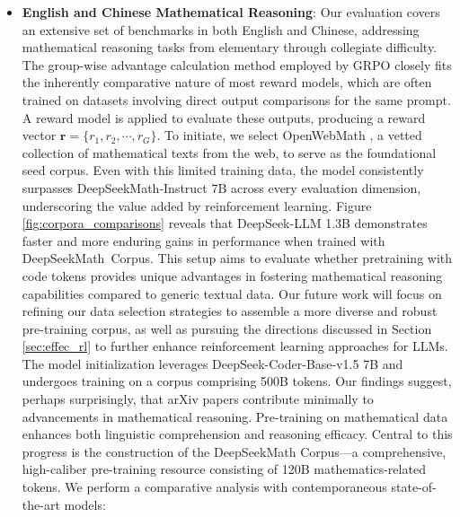 \begin{itemize}[topsep=0pt]
    \item \textbf{English and Chinese Mathematical Reasoning}: Our evaluation covers an extensive set of benchmarks in both English and Chinese, addressing mathematical reasoning tasks from elementary through collegiate difficulty. The group-wise advantage calculation method employed by GRPO closely fits the inherently comparative nature of most reward models, which are often trained on datasets involving direct output comparisons for the same prompt. A reward model is applied to evaluate these outputs, producing a reward vector $\mathbf{r} = \{r_1, r_2, \cdots, r_G\}$. To initiate, we select OpenWebMath \citep{openwebmath}, a vetted collection of mathematical texts from the web, to serve as the foundational seed corpus. Even with this limited training data, the model consistently surpasses DeepSeekMath-Instruct 7B across every evaluation dimension, underscoring the value added by reinforcement learning. Figure \ref{fig:corpora_comparisons} reveals that DeepSeek-LLM 1.3B demonstrates faster and more enduring gains in performance when trained with DeepSeekMath~Corpus. This setup aims to evaluate whether pretraining with code tokens provides unique advantages in fostering mathematical reasoning capabilities compared to generic textual data. Our future work will focus on refining our data selection strategies to assemble a more diverse and robust pre-training corpus, as well as pursuing the directions discussed in Section \ref{sec:effec_rl} to further enhance reinforcement learning approaches for LLMs. The model initialization leverages DeepSeek-Coder-Base-v1.5 7B \citep{deepseek-coder} and undergoes training on a corpus comprising 500B tokens. Our findings suggest, perhaps surprisingly, that arXiv papers contribute minimally to advancements in mathematical reasoning. Pre-training on mathematical data enhances both linguistic comprehension and reasoning efficacy. Central to this progress is the construction of the DeepSeekMath Corpus—a comprehensive, high-caliber pre-training resource consisting of 120B mathematics-related tokens. We perform a comparative analysis with contemporaneous state-of-the-art models:


\end{itemize}
